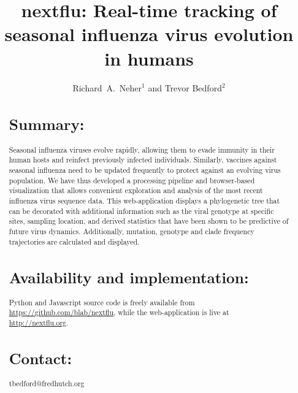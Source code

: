 \documentclass{bioinfo}
\begin{document}
\title[Tracking of seasonal influenza virus evolution]{nextflu: Real-time tracking of seasonal influenza virus evolution in humans}
\author{Richard~A.~Neher$^{1}$ and Trevor Bedford$^{2}$}
\address{$^{1}$Max Planck Institute for Developmental Biology, 72076 T\"ubingen, Germany, and $^{2}$Vaccine and Infectious Disease Division, Fred Hutchinson Cancer Research Center, Seattle, WA 98109, USA}


\maketitle

\begin{abstract} \section{Summary:} Seasonal influenza viruses evolve rapidly, allowing them to evade immunity in their human hosts and reinfect previously infected individuals.
Similarly, vaccines against seasonal influenza need to be updated frequently to protect against an evolving virus population.
We have thus developed a processing pipeline and browser-based visualization that allows convenient exploration and analysis of the most recent influenza virus sequence data.
This web-application displays a phylogenetic tree that can be decorated with additional information such as the viral genotype at specific sites, sampling location, and derived statistics that have been shown to be predictive of future virus dynamics.
Additionally, mutation, genotype and clade frequency trajectories are calculated and displayed.

\section{Availability and implementation:} Python and Javascript source code is freely available from \url{https://github.com/blab/nextflu}, while the web-application is live at \url{http://nextflu.org}.

\section{Contact:} tbedford@fredhutch.org

\end{abstract}
\end{document}
